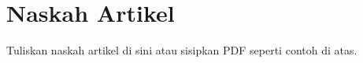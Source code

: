 \documentclass[publikasi]{unnes-ta_plus}
\begin{document}
\maketitleunnes
\unnesPersetujuanPembimbing

\tableofcontents
\unnesMainMatter

% 

\chapter{Naskah Artikel}
Tuliskan naskah artikel di sini atau sisipkan PDF seperti contoh di atas.
\end{document}
